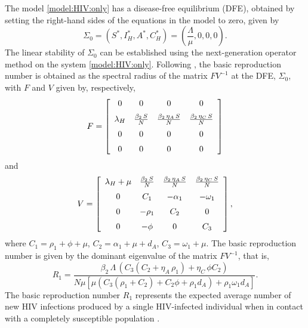 \documentclass{my_aims}
\theoremstyle{definition}
\begin{document}
The model \eqref{model:HIV:only} has a disease-free equilibrium (DFE),
obtained by setting the right-hand sides of the equations
in the model to zero, given by
\begin{equation*}
\Sigma_0 = \left(S^*, I^*_H, A^*, C^*_H  \right)
= \left(\frac{\Lambda}{\mu},0, 0,0  \right).
\end{equation*}
The linear stability of $\Sigma_0$ can be established using the
next-generation operator method on the system \eqref{model:HIV:only}.
Following \cite{van:den:Driessche:2002}, the basic reproduction number is obtained
as the spectral radius of the matrix $F  V^{-1}$ at the DFE, $\Sigma_0$, with
$F$ and $V$ given by, respectively,
\begin{equation*}
F =  \left[ \begin {array}{cccc} 0&0&0&0\\ \noalign{\medskip}
\lambda_H &{\frac {{\beta_2}\,S}{{N}}}&{\frac {{\beta_2}\,{
\eta_A}\,S}{{N}}}&{\frac {{\beta_2}\,{\eta_C}\,S}{{N}}
}\\ \noalign{\medskip}
0&0&0&0\\ \noalign{\medskip}
0&0&0&0\end {array}
 \right]
\end{equation*}
and
\begin{equation*}
V = \left[ \begin {array}{cccc}
\lambda_H +\mu&{\frac {{
\beta_2}\,S}{{N}}}&{\frac {{\beta_2}\,{\eta_A}\,S}{{N}
}}&{\frac {{\beta_2}\,{\eta_C}\,S}{{N}}}\\ \noalign{\medskip}
0&C_1&-{\alpha_1}&-{\omega_1}\\ \noalign{\medskip}
0&-{\rho_1}&C_2&0\\ \noalign{\medskip}
0&-\phi&0&C_3
\end{array} \right],
\end{equation*}
where $C_1 = \rho_1 + \phi + \mu$, $C_2 = \alpha_1 + \mu + d_A$, $C_3 = \omega_1 + \mu$.
The basic reproduction number is given by the dominant eigenvalue
of the matrix $F  V^{-1}$, that is,
\begin{equation}
\label{eq:R0:HIV:only}
R_1 = \frac{{\beta_2}\,\Lambda\, \left( C_3(C_2 +{\eta_A}\,{\rho_1})
+{\eta_C}\,\phi C_2 \right)}{N \mu \left[ \mu \left(C_3(\rho_1 + C_2)
+ C_2 \phi + \rho_1 d_A \right) + \rho_1 \omega_1 d_A  \right]}.
\end{equation}
The basic reproduction number $R_1$ represents the expected average number of new HIV infections
produced by a single HIV-infected individual when in contact with a completely susceptible
population \cite{van:den:Driessche:2002}.
\end{document}
